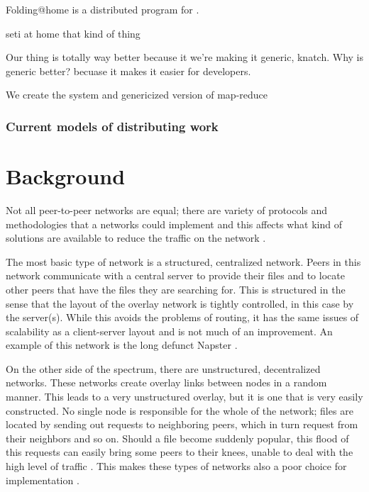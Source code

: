 \documentclass[conference, compsocconf, letterpaper]{IEEEtran}
\begin{document}
Folding@home is a distributed program for \cite{folding}. 

seti at home that kind of thing



Our thing is totally way better because it we're making it generic, knatch.  Why is generic better?  becuase it makes it easier for developers. 

We create the system and genericized version of map-reduce 

\subsubsection{Current models of distributing work}




\section{Background}
Not all peer-to-peer networks are equal; there are variety of protocols and methodologies that a networks could implement and this affects what kind of solutions are available to reduce the traffic on the network    \cite{SurveyCompare} \cite{Overview}.

The most basic type of network is a structured, centralized  network.  Peers in this network communicate with a central server to provide their files and to locate other peers that have the files they are searching for.  This is structured in the sense that the layout of the overlay network is tightly controlled, in this case by the server(s). While this avoids the problems of routing, it has the same issues of scalability as a client-server layout and is not much of an improvement. An example of this network is the long defunct Napster  \cite{SurveyCompare} \cite{Overview}.

On the other side of the spectrum, there are unstructured, decentralized networks.  These networks create overlay links between nodes in a random manner. This leads to a very unstructured overlay, but it is one that is very easily constructed.  No single node is responsible for the whole of the network;  files are located by sending out requests to neighboring peers, which in turn request from their neighbors and so on. Should a file become suddenly popular, this flood of this requests can easily bring some peers to their knees, unable to deal with the high level of traffic \cite{Lv:2002:SRU:514191.514206}.  This makes these types of networks also a poor choice for implementation \cite{Overview}.
\end{document}
